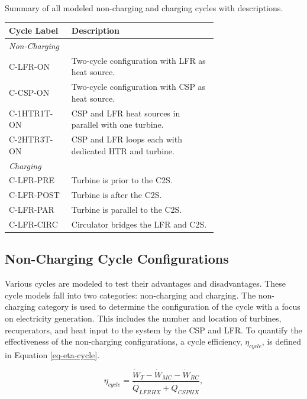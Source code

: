 \begin{paracol}{2}
\begin{specialtable}[H] 
    \caption{Summary of all modeled non-charging and charging cycles with descriptions. \label{tab-cycle_sum}}
    \begin{tabular}{lL{0.7\linewidth}}
    \toprule
    \textbf{Cycle Label} & \textbf{Description}\\
    \midrule
    \textit{Non-Charging}\\
    C-LFR-ON & Two-cycle configuration with LFR as heat source.\\
    C-CSP-ON & Two-cycle configuration with CSP as heat source.\\
    C-1HTR1T-ON & CSP and LFR heat sources in parallel with one turbine.\\
    C-2HTR3T-ON & CSP and LFR loops each with dedicated HTR and turbine.\\
    \midrule
    \textit{Charging}\\
    C-LFR-PRE & Turbine is prior to the C2S.\\
    C-LFR-POST & Turbine is after the C2S.\\
    C-LFR-PAR & Turbine is parallel to the C2S.\\
    C-LFR-CIRC & Circulator bridges the LFR and C2S.\\
    \bottomrule
    \end{tabular}
\end{specialtable}

\subsection{Non-Charging Cycle Configurations} 

Various cycles are modeled to test their advantages and disadvantages. These cycle models fall into two categories: non-charging and charging. The non-charging category is used to determine the configuration of the cycle with a focus on electricity generation. This includes the number and location of turbines, recuperators, and heat input to the system by the CSP and LFR. To quantify the effectiveness of the non-charging configurations, a cycle efficiency, $\eta_{cycle}$, is defined in Equation \ref{eq-eta-cycle}.

\begin{equation}
    \label{eq-eta-cycle}
    \eta_{cycle} = \frac{\dot{W}_{T}-\dot{W}_{MC}-\dot{W}_{RC}}{\dot{Q}_{LFRHX}+\dot{Q}_{CSPHX}},
\end{equation}


\end{paracol}

